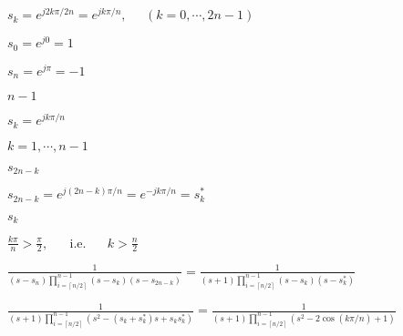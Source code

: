 \documentclass{article}
\def\lthtmlcheckvsize{\ifdim\ht\sizebox<\vsize 
  \ifdim\wd\sizebox<\hsize\expandafter\hfill\fi \expandafter\vfill
  \else\expandafter\vss\fi}%
\begin{document}
{\newpage\clearpage
{}%
$\displaystyle s_k=e^{j2k\pi/2n}=e^{jk\pi/n},\;\;\;\;\;(k=0,\cdots,2n-1)
    $%
\lthtmlindisplaymathZ
\lthtmlcheckvsize\clearpage}

{\newpage\clearpage
{}%
$s_0=e^{j0}=1$%
\lthtmlindisplaymathZ
\lthtmlcheckvsize\clearpage}

{\newpage\clearpage
{}%
$s_n=e^{j\pi}=-1$%
\lthtmlindisplaymathZ
\lthtmlcheckvsize\clearpage}

{\newpage\clearpage
{}%
$n-1$%
\lthtmlindisplaymathZ
\lthtmlcheckvsize\clearpage}

{\newpage\clearpage
{}%
$s_k=e^{jk\pi/n}$%
\lthtmlindisplaymathZ
\lthtmlcheckvsize\clearpage}

{\newpage\clearpage
{}%
$k=1,\cdots,n-1$%
\lthtmlindisplaymathZ
\lthtmlcheckvsize\clearpage}

{\newpage\clearpage
{}%
$s_{2n-k}$%
\lthtmlindisplaymathZ
\lthtmlcheckvsize\clearpage}

{\newpage\clearpage
{}%
$\displaystyle s_{2n-k}=e^{j(2n-k)\pi/n}=e^{-jk\pi/n}=s_k^*
    $%
\lthtmlindisplaymathZ
\lthtmlcheckvsize\clearpage}

{\newpage\clearpage
{}%
$s_k$%
\lthtmlindisplaymathZ
\lthtmlcheckvsize\clearpage}

{\newpage\clearpage
{}%
$\displaystyle \frac{k\pi}{n}>\frac{\pi}{2},\;\;\;\;\;\;\mbox{i.e.}\;\;\;\;\;\;k>\frac{n}{2}
    $%
\lthtmlindisplaymathZ
\lthtmlcheckvsize\clearpage}

{\newpage\clearpage
{}%
$\displaystyle \frac{1}{(s-s_n)\prod_{i=\left\lceil n/2 \right\rceil}^{n-1}(s-s_k)(s-s_{2n-k})}
=\frac{1}{(s+1)\prod_{i=\left\lceil n/2 \right\rceil}^{n-1}(s-s_k)(s-s_k^*)}$%
\lthtmlindisplaymathZ
\lthtmlcheckvsize\clearpage}

{\newpage\clearpage
{}%
$\displaystyle \frac{1}{(s+1)\prod_{i=\left\lceil n/2 \right\rceil}^{n-1}(s^2-(s_k+s_k^*)s+s_k s_k^*)}
=\frac{1}{(s+1)\prod_{i=\left\lceil n/2 \right\rceil}^{n-1}(s^2-2\cos(k\pi/n)+1)}$%
\lthtmlindisplaymathZ
\lthtmlcheckvsize\clearpage}
\end{document}
